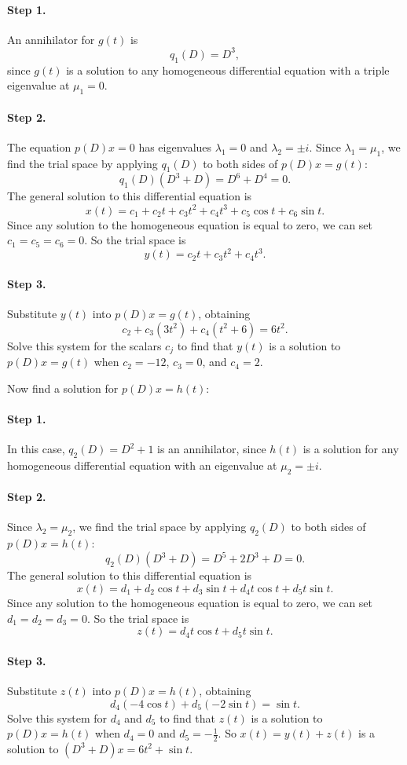 \documentclass{ximera}
\begin{document}
\paragraph{Step 1.} An annihilator for $g(t)$ is
\[
q_1(D) = D^3,
\]
since $g(t)$ is a solution to any homogeneous differential equation
with a triple eigenvalue at $\mu_1 = 0$.

\paragraph{Step 2.} The equation $p(D)x = 0$ has eigenvalues
$\lambda_1 = 0$ and $\lambda_2 = \pm i$.  Since $\lambda_1 = \mu_1$,
we find the trial space by applying $q_1(D)$ to both sides of $p(D)x =
g(t)$:
\[
q_1(D)(D^3 + D) = D^6 + D^4 = 0.
\]
The general solution to this differential equation is
\[
x(t) = c_1 + c_2t + c_3t^2 + c_4t^3 + c_5\cos t + c_6\sin t.
\]
Since any solution to the homogeneous equation is equal to zero, we can
set $c_1 = c_5 = c_6 = 0$.  So the trial space is
\[
y(t) = c_2t + c_3t^2 + c_4t^3.
\]
\paragraph{Step 3.} Substitute $y(t)$ into $p(D)x = g(t)$, obtaining
\[
c_2 + c_3(3t^2) + c_4(t^2 + 6) = 6t^2.
\]
Solve this system for the scalars $c_j$ to find that $y(t)$ is a solution
to $p(D)x = g(t)$ when $c_2 = -12$, $c_3 = 0$, and $c_4 = 2$.

\para Now find a solution for $p(D)x = h(t)$:

\paragraph{Step 1.} In this case, $q_2(D) = D^2 + 1$ is an annihilator,
since $h(t)$ is a solution for any homogeneous differential equation
with an eigenvalue at $\mu_2 = \pm i$.

\paragraph{Step 2.} Since $\lambda_2 = \mu_2$, we find the trial space
by applying $q_2(D)$ to both sides of $p(D)x = h(t)$:
\[
q_2(D)(D^3 + D) = D^5 + 2D^3 + D = 0.
\]
The general solution to this differential equation is
\[
x(t) = d_1 + d_2\cos t + d_3\sin t + d_4t\cos t + d_5t\sin t.
\]
Since any solution to the homogeneous equation is equal to zero, we can
set $d_1 = d_2 = d_3 = 0$.  So the trial space is
\[
z(t) = d_4t\cos t + d_5t\sin t.
\]
\paragraph{Step 3.} Substitute $z(t)$ into $p(D)x = h(t)$, obtaining
\[
d_4(-4\cos t) + d_5(-2\sin t) = \sin t.
\]
Solve this system for $d_4$ and $d_5$ to find that $z(t)$ is a solution
to $p(D)x = h(t)$ when $d_4 = 0$ and $d_5 = -\frac{1}{2}$.  So $x(t) =
y(t) + z(t)$ is a solution to $(D^3 + D)x = 6t^2 + \sin t$.
\end{document}
